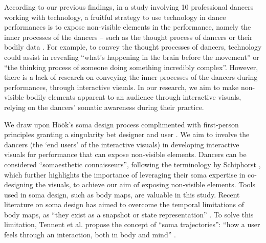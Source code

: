 According to our previous findings, in a study involving 10 professional dancers working with technology, a fruitful strategy to use technology in dance performances is to expose non-visible elements in the performance, namely the inner processes of the dancers – such as the thought process of dancers or their bodily data \cite{masu_how_2019}. For example, to convey the thought processes of dancers, technology could assist in revealing “what’s happening in the brain before the movement” or “the thinking process of someone doing something incredibly complex”. 
However, there is a lack of research on conveying the inner processes of the dancers during performances, through interactive visuals. In our research, we aim to make non-visible bodily elements apparent to an audience through interactive visuals, relying on the dancers’ somatic awareness during their practice.


We draw upon Höök's soma design process complimented with first-person principles granting a singularity bet designer and user \cite{hook_designing_2018}. We aim to involve the dancers (the ‘end users’ of the interactive visuals) in developing interactive visuals for performance that can expose non-visible elements. Dancers can be considered “somaesthetic connaisseurs”, following the terminology by Schiphorst \cite{schiphorst_self-evidence_2011}, which further highlights the importance of leveraging their soma expertise in co-designing the visuals, to achieve our aim of exposing non-visible elements. Tools used in soma design, such as body maps, are valuable in this study. Recent literature on soma design has aimed to overcome the temporal limitations of body maps, as “they exist as a snapshot or state representation” \cite{tennent_articulating_2021}. To solve this limitation, Tennent et al. propose the concept of “soma trajectories”: “how a user feels through an interaction, both in body and mind”  \cite{tennent_articulating_2021}.


